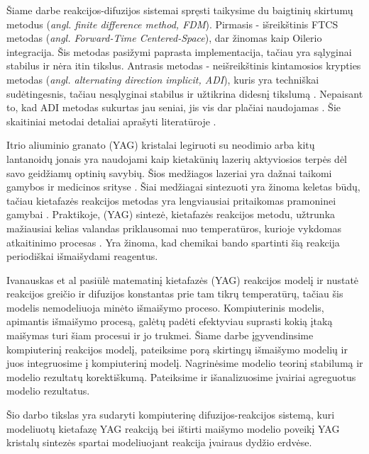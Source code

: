 Šiame darbe reakcijos-difuzijos sistemai spręsti taikysime du baigtinių skirtumų metodus (\textit{angl. finite difference method, FDM}). Pirmasis - išreikštinis FTCS metodas (\textit{angl. Forward-Time Centered-Space}), dar žinomas kaip Oilerio integracija. Šis metodas pasižymi paprasta implementacija, tačiau yra sąlyginai stabilus ir nėra itin tikslus. Antrasis metodas - neišreikštinis kintamosios krypties metodas (\textit{angl. alternating direction implicit, ADI}), kuris yra techniškai sudėtingesnis, tačiau nesąlyginai stabilus ir užtikrina didesnį tikslumą \cite{doi:10.1137/0103003}. Nepaisant to, kad ADI metodas sukurtas jau seniai, jis vis dar plačiai naudojamas \cite{gaidamauskaiteComparisonFiniteDifference2007}. Šie skaitiniai metodai detaliai aprašyti literatūroje \cite{pressNumericalRecipes3rd2007,levequeFiniteDifferenceMethods2007}.

Itrio aliuminio granato (YAG) kristalai legiruoti su neodimio arba kitų lantanoidų jonais yra naudojami kaip kietakūnių lazerių aktyviosios terpės dėl savo geidžiamų optinių savybių. Šios medžiagos lazeriai yra dažnai taikomi gamybos ir medicinos srityse \cite{dubeyExperimentalStudyNd2008, valentiUseErYAG2021}. Šiai medžiagai sintezuoti yra žinoma keletas būdų, tačiau kietafazės reakcijos metodas yra lengviausiai pritaikomas pramoninei gamybai \cite{bhattacharyyaMethodsSynthesisY3AI5O122007, zhangNovelSynthesisYAG2005}. Praktikoje, (YAG) sintezė, kietafazės reakcijos metodu, užtrunka mažiausiai kelias valandas priklausomai nuo temperatūros, kurioje vykdomas atkaitinimo procesas \cite{mackeviciusCloserLookComputer2012}. Yra žinoma, kad chemikai bando spartinti šią reakcija periodiškai išmaišydami reagentus.

Ivanauskas et al \cite{ivanauskasModellingSolidState2005} pasiūlė matematinį kietafazės (YAG) reakcijos modelį ir nustatė reakcijos greičio ir difuzijos konstantas prie tam tikrų temperatūrų, tačiau šis modelis nemodeliuoja minėto išmaišymo proceso. Kompiuterinis modelis, apimantis išmaišymo procesą, galėtų padėti efektyviau suprasti kokią įtaką maišymas turi šiam procesui ir jo trukmei. Šiame darbe įgyvendinsime kompiuterinį reakcijos modelį, pateiksime porą skirtingų išmaišymo modelių ir juos integruosime į kompiuterinį modelį. Nagrinėsime modelio teorinį stabilumą ir modelio rezultatų korektiškumą. Pateiksime ir išanalizuosime įvairiai agreguotus modelio rezultatus.

Šio darbo tikslas yra sudaryti kompiuterinę difuzijos-reakcijos sistemą, kuri modeliuotų kietafazę YAG reakciją bei ištirti maišymo modelio poveikį YAG kristalų sintezės spartai modeliuojant reakcija įvairaus dydžio erdvėse.

